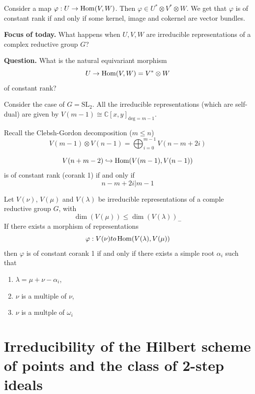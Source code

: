 \medskip\noindent
Consider a map $\varphi: U \to \mathop{\mathrm{Hom}}\nolimits(V,W)$.
Then $\varphi \in U^* \otimes  V^* \otimes
W$.
We get that
$\varphi$ is of constant rank if and only if
some kernel, image and cokernel are vector
bundles.

\medskip\noindent
{\bf Focus of today.} What happens when
$U,V,W$ are irreducible
representations of a complex reductive group
$G$?

\medskip\noindent
{\bf Question.} What is the natural
equivariant morphism
$$
U \to \mathop{\mathrm{Hom}}\nolimits(V,W)=V^* \otimes  W
$$
of constant rank?

\medskip\noindent
Consider the case of $G=\text{SL}_2$. All the
irreducible representations (which are
self-dual) are given by
$V(m-1)\cong
\mathbb{C}[x,y]_{\text{deg}=m-1}$.

Recall the Clebsh-Gordon decomposition ($m
\leq  n$)
$$
V(m-1)\otimes
V(n-1)=\bigoplus_{i=0}^{m-1}V(n-m+2i)
$$

\begin{theorem}
\label{theorem-BFL22}
$$
V(n+m-2)\hookrightarrow \mathop{\mathrm{Hom}}\nolimits(V(m-1),V(n-1))
$$
is of constant rank (corank 1) if and only if
$$
n-m+2i|m-1
$$
\end{theorem}

\begin{theorem}
\label{theorem-BFF25}
Let $V(\nu)$, $V(\mu)$ and $V(\lambda)$ be
irreducible representations
of a comple reductive group $G$, with
$$
\dim(V(\mu)) \leq \dim(V(\lambda))_-
$$
If there exists a morphism of representations
$$
\varphi: V (\nu) to \mathop{\mathrm{Hom}}\nolimits (V (\lambda),V(\mu))
$$
then $\varphi$ is of constant corank 1 if and
only if
there exists a simple root $\alpha_i$ such
that
\begin{enumerate}
\item $\lambda=\mu+\nu-\alpha_i$,
\item $\nu$ is a multiple of $\nu$,
\item  $\nu$ is a multple of $\omega_i$
\end{enumerate}
\end{theorem}

\section{Irreducibility of the Hilbert scheme
of points and the class of 2-step
ideals}
\label{section-graffeo-two-step-ideals}

